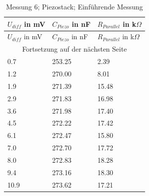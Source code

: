 \documentclass[12pt]{scrreprt} %
\begin{document}
\setlongtables
\begin{longtable}{| l |l| l |}
\caption{Messung 6; Piezostack; Einführende Messung}\\
\hline
$U_{diff}$ in mV&$C_{Piezo}$ in nF&$R_{Parallel}$ in k$\Omega$\\
\hline
\endfirsthead
\hline
$U_{diff}$ in mV&$C_{Piezo}$ in nF&$R_{Parallel}$ in k$\Omega$\\
\hline
\endhead
\hline
\multicolumn{3}{|c|}{Fortsetzung auf der nächsten Seite}\\
\hline
\endfoot
\hline \hline
\endlastfoot
\hline
\label{tab:2.6}%
0.7&253.25&2.39\\
1.2&270.00&8.01\\
1.9&271.39&15.48\\
2.9&271.83&16.98\\
3.6&271.98&17.40\\
4.5&272.22&17.42\\
6.1&272.47&15.80\\
7.0&272.70&17.72\\
8.0&272.83&18.28\\
9.4&273.16&18.30\\
10.9&273.62&17.21\\
\end{longtable}
\end{document}
